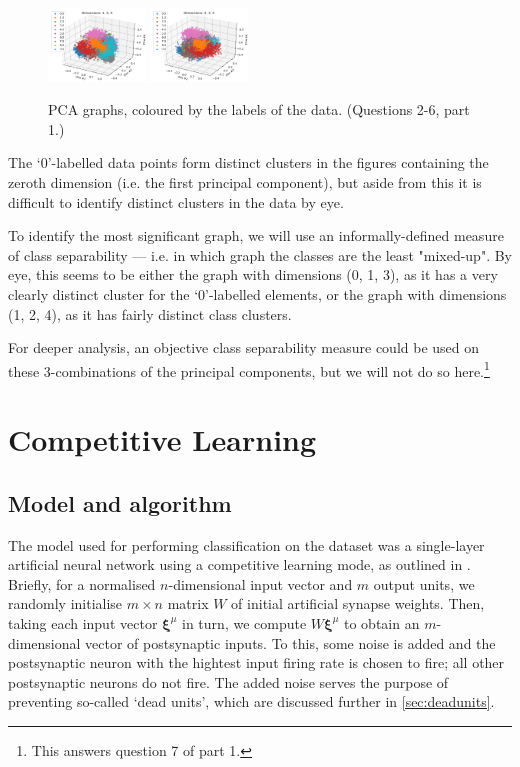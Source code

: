 \documentclass[a4paper, 11pt, twocolumn, final]{article} %
\begin{document}
\begin{figure}
  \includegraphics[width=0.23\textwidth]{pca/134.png}
  \includegraphics[width=0.23\textwidth]{pca/234.png}
  \caption{PCA graphs, coloured by the labels of the data.
           (Questions 2-6, part 1.)}
  \label{fig:pca_graphs}
\end{figure}

The `0'-labelled data points form distinct clusters in the figures containing
the zeroth dimension (i.e. the first principal component), but aside from this
it is difficult to identify distinct clusters in the data by eye.

To identify the most significant graph, we will use an informally-defined
measure of class separability --- i.e. in which graph the classes are the least
"mixed-up".  By eye, this seems to be either the graph with dimensions (0, 1,
3), as it has a very clearly distinct cluster for the `0'-labelled elements, or
the graph with dimensions (1, 2, 4), as it has fairly distinct class clusters.

For deeper analysis, an objective class separability measure could be used on
these 3-combinations of the principal components, but we will not do so
here.\footnote{This answers question 7 of part 1.}

\section{Competitive Learning} \subsection{Model and algorithm} The model used
for performing classification on the dataset was a single-layer artificial
neural network using a competitive learning mode, as outlined in \cite{hertz91}.
Briefly, for a normalised $n$-dimensional input vector and $m$ output units, we
randomly initialise $m{\times}n$ matrix $W$ of initial artificial synapse
weights.  Then, taking each input vector $\bm{\xi}^\mu$ in turn, we compute
$W\bm{\xi}^\mu$ to obtain an $m$-dimensional vector of postsynaptic inputs.  To
this, some noise is added and the postsynaptic neuron with the hightest input
firing rate is chosen to fire; all other postsynaptic neurons do not fire.  The
added noise serves the purpose of preventing so-called `dead units', which are
discussed further in \autoref{sec:deadunits}.
\end{document}
